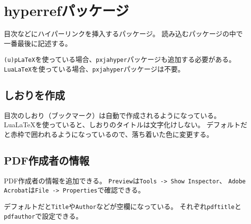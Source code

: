 \section{hyperrefパッケージ}

目次などにハイパーリンクを挿入するパッケージ。
読み込むパッケージの中で一番最後に記述する。

\texttt{(u)pLaTeX}を使っている場合、\texttt{pxjahyper}パッケージも追加する必要がある。
\texttt{LuaLaTeX}を使っている場合、\texttt{pxjahyper}パッケージは不要。

\subsection{しおりを作成}

目次のしおり（ブックマーク）は自動で作成されるようになっている。
LuaLaTeXを使っていると、しおりのタイトルは文字化けしない。
デフォルトだと赤枠で囲われるようになっているので、落ち着いた色に変更する。

\subsection{PDF作成者の情報}

PDF作成者の情報を追加できる。
\texttt{Preview}は\texttt{Tools -> Show Inspector}、
\texttt{Adobe Acrobat}は\texttt{File -> Properties}で確認できる。

デフォルトだと\texttt{Title}や\texttt{Author}などが空欄になっている。
それぞれ\texttt{pdftitle}と\texttt{pdfauthor}で設定できる。
